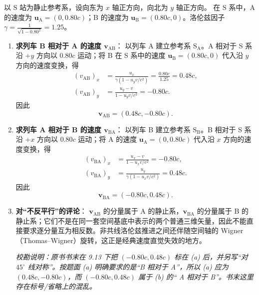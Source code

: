 \begin{solution}
以 S 站为静止参考系，设向东为 $x$ 轴正方向，向北为 $y$ 轴正方向。
在 S 系中，A 的速度为 $\boldsymbol{u}_{\mathrm{A}} = (0, 0.80c)$；B 的速度为 $\boldsymbol{u}_{\mathrm{B}} = (0.80c, 0)$。洛伦兹因子 $\gamma = \frac{1}{\sqrt{1-0.80^2}} = 1.25$。

\begin{enumerate}
    \item[(a)] \textbf{求列车 B 相对于 A 的速度 $\boldsymbol{v}_{\mathrm{AB}}$}：
    以列车 A 建立参考系 $\mathrm{S}_{\mathrm{A}}$。A 相对于 S 系沿 $+y$ 方向以 $0.80c$ 运动；将 B 在 S 系中的速度 $\boldsymbol{u}_{\mathrm B}=(0.80c,0)$ 代入沿 $y$ 方向的速度变换，得
    \begin{align*}
        (v_{\mathrm{AB}})_x &= \frac{u_x}{\gamma(1-u_yv/c^2)}
        =\frac{0.80c}{1.25}=0.48c,\\
        (v_{\mathrm{AB}})_y &= \frac{u_y-v}{1-u_yv/c^2}
        =-0.80c.
    \end{align*}
    因此
    $$\boxed{\boldsymbol{v}_{\mathrm{AB}}=(0.48c,-0.80c)}.$$

    \item[(b)] \textbf{求列车 A 相对于 B 的速度 $\boldsymbol{v}_{\mathrm{BA}}$}：
    以列车 B 建立参考系 $\mathrm{S}_{\mathrm B}$。B 相对于 S 系沿 $+x$ 方向以 $0.80c$ 运动；将 A 的速度 $\boldsymbol{u}_{\mathrm A}=(0,0.80c)$ 代入沿 $x$ 方向的速度变换，得
    \begin{align*}
        (v_{\mathrm{BA}})_x &= \frac{u_x-v}{1-u_xv/c^2}=-0.80c,\\
        (v_{\mathrm{BA}})_y &= \frac{u_y}{\gamma(1-u_xv/c^2)}=0.48c.
    \end{align*}
    因此
    $$\boxed{\boldsymbol{v}_{\mathrm{BA}}=(-0.80c,0.48c)}.$$

    \item[(c)] \textbf{对“不反平行”的评论}：
    $\boldsymbol{v}_{\mathrm{AB}}$ 的分量属于 A 的静止系，$\boldsymbol{v}_{\mathrm{BA}}$ 的分量属于 B 的静止系；它们不是在同一套空间基底中表示的两个普通三维矢量，因此不能直接要求逐分量互为相反数。非共线洛伦兹推进之间还伴随空间轴的 Wigner（Thomas--Wigner）旋转，这正是经典速度直觉失效的地方。

    \textit{校勘说明：原书书末在 9.13 下把 $(-0.80c,0.48c)$ 标在 (a) 后，并另写“对 $45^\circ$ 线对称”。按题面 (a) 明确要求的是“B 相对于 A”，所以 (a) 应为 $(0.48c,-0.80c)$，而 $(-0.80c,0.48c)$ 属于 (b) 的“ A 相对于 B”。书末这里存在标号/省略上的混乱。}
\end{enumerate}
\end{solution}


